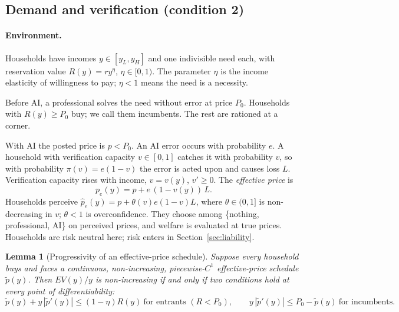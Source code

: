 \documentclass[12pt]{article}
\newtheorem{lemma}{Lemma}
\theoremstyle{remark}
\begin{document}
\subsection{Demand and verification (condition 2)}\label{sec:verification}

\paragraph{Environment.} Households have incomes $y\in[y_L,y_H]$ and one indivisible need each, with reservation value $R(y)=ry^\eta$, $\eta\in[0,1)$. The parameter $\eta$ is the income elasticity of willingness to pay; $\eta<1$ means the need is a necessity.

Before AI, a professional solves the need without error at price $P_0$. Households with $R(y)\ge P_0$ buy; we call them incumbents. The rest are rationed at a corner.

With AI the posted price is $p<P_0$. An AI error occurs with probability $e$. A household with verification capacity $v\in[0,1]$ catches it with probability $v$, so with probability $\pi(v)=e(1-v)$ the error is acted upon and causes loss $L$. Verification capacity rises with income, $v=v(y)$, $v'\ge0$. The \emph{effective price} is
\begin{equation}
p_e(y)=p+e\,(1-v(y))\,L .
\end{equation}
Households perceive $\hat p_e(y)=p+\theta(v)e(1-v)L$, where $\theta\in(0,1]$ is non-decreasing in $v$; $\theta<1$ is overconfidence. They choose among \{nothing, professional, AI\} on perceived prices, and welfare is evaluated at true prices. Households are risk neutral here; risk enters in Section~\ref{sec:liability}.

\begin{lemma}[Progressivity of an effective-price schedule]\label{lem:schedule}
Suppose every household buys and faces a continuous, non-increasing, piecewise-$C^1$ effective-price schedule $\tilde p(y)$. Then $EV(y)/y$ is non-increasing if and only if two conditions hold at every point of differentiability:
\[
\tilde p(y)+y\,|\tilde p'(y)|\le(1-\eta)R(y)\ \text{for entrants }(R<P_0),\qquad y\,|\tilde p'(y)|\le P_0-\tilde p(y)\ \text{for incumbents}.
\]
\end{lemma}
\end{document}
